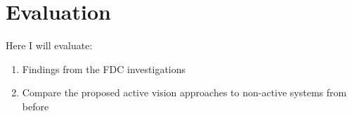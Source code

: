 \chapter{Evaluation}
Here I will evaluate:
\begin{enumerate}
  \item Findings from the FDC investigations
  \item Compare the proposed active vision approaches to non-active systems from before
\end{enumerate}




